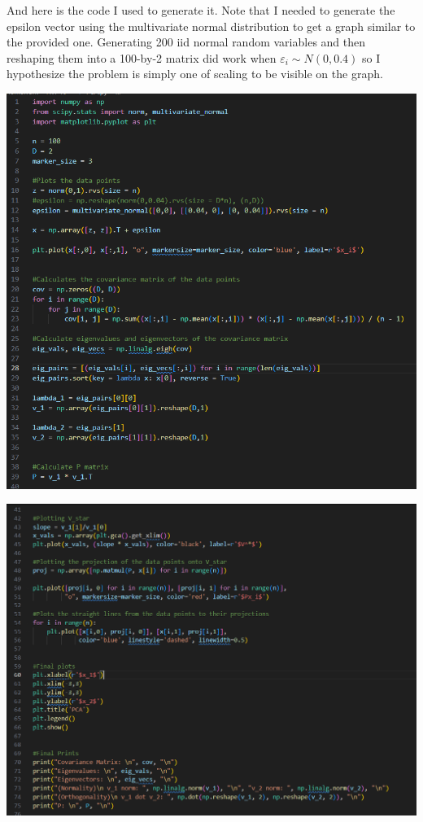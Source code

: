 \documentclass[11pt,letterpaper, leqno]{article}
\numberwithin{equation}{section}
\numberwithin{theorem}{section}
\numberwithin{lemma}{section}
\numberwithin{corollary}{section}
\numberwithin{definition}{section}
\numberwithin{proposition}{section}
\numberwithin{remark}{section}
\numberwithin{example}{section}
\begin{document}
        And here is the code I used to generate it. Note that I needed to generate the epsilon vector using the multivariate normal distribution to get a graph similar to the provided one. Generating 200 iid normal random variables and then reshaping them into a 100-by-2 matrix did work when $\varepsilon_i \sim N(0, 0.4)$ so I hypothesize the problem is simply one of scaling to be visible on the graph. 

        \begin{center}
            \includegraphics[width=\textwidth]{Code 1.png}
        \end{center}

        \begin{center}
            \includegraphics[width=\textwidth]{Code 2.png}
        \end{center}
    \color{black}

\newpage

%

\end{document}
